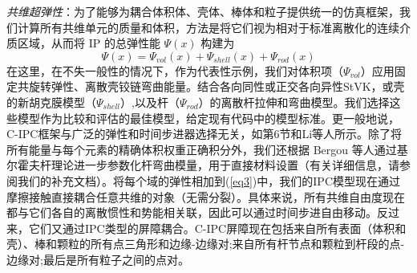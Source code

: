 \textit{共维超弹性}：为了能够为耦合体积体、壳体、棒体和粒子提供统一的仿真框架，我们计算所有共维单元的质量和体积，方法是将它们视为相对于标准离散化的连续介质区域，从而将 IP 的总弹性能 $\Psi(x)$ 构建为
\begin{equation}\label{eq3}
  \Psi(x) =  \Psi_{vol}(x) + \Psi_{shell}(x) + \Psi_{rod}(x) 
\end{equation}
在这里，在不失一般性的情况下，作为代表性示例，我们对体积项（$\Psi_{vol}$）应用固定共旋转弹性、离散壳铰链弯曲能量。结合各向同性或正交各向异性StVK，或壳的新胡克膜模型（$\Psi_{shell}$）,以及杆（$\Psi_{rod}$）的离散杆拉伸和弯曲模型。我们选择这些模型作为比较和评估的最佳模型，给定现有代码中的模型标准。更一般地说，C-IPC框架与广泛的弹性和时间步进器选择无关，如第6节和Li等人所示。除了将所有能量与每个元素的精确体积权重正确积分外，我们还根据 Bergou 等人通过基尔霍夫杆理论进一步参数化杆弯曲模量，用于直接材料设置（有关详细信息，请参阅我们的补充文档）。将每个域的弹性相加到(\ref{eq3})中，我们的IPC模型现在通过摩擦接触直接耦合任意共维的对象（无需分裂）。具体来说，所有共维自由度现在都与它们各自的离散惯性和势能相关联，因此可以通过时间步进自由移动。反过来，它们又通过IPC类型的屏障耦合。C-IPC屏障现在包括来自所有表面（体积和壳）、棒和颗粒的所有点三角形和边缘-边缘对;来自所有杆节点和颗粒到杆段的点-边缘对;最后是所有粒子之间的点对。
